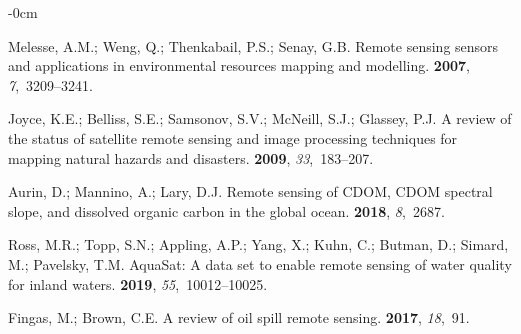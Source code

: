 \documentclass[remotesensing,article,accept,pdftex,moreauthors]{Definitions/mdpi}
\begin{document}
\begin{adjustwidth}{-\extralength}{0cm}




\begin{thebibliography}{999}

Melesse, A.M.; Weng, Q.; Thenkabail, P.S.; Senay, G.B.
\newblock Remote sensing sensors and applications in environmental resources
  mapping and modelling.
 {\bf 2007}, {\em 7},~3209--3241.

Joyce, K.E.; Belliss, S.E.; Samsonov, S.V.; McNeill, S.J.; Glassey, P.J.
\newblock A review of the status of satellite remote sensing and image
  processing techniques for mapping natural hazards and disasters.
 {\bf 2009}, {\em 33},~183--207.

Aurin, D.; Mannino, A.; Lary, D.J.
\newblock Remote sensing of CDOM, CDOM spectral slope, and dissolved organic
  carbon in the global ocean.
 {\bf 2018}, {\em 8},~2687.

Ross, M.R.; Topp, S.N.; Appling, A.P.; Yang, X.; Kuhn, C.; Butman, D.; Simard,
  M.; Pavelsky, T.M.
\newblock AquaSat: A data set to enable remote sensing of water quality for
  inland waters.
 {\bf 2019}, {\em 55},~10012--10025.

Fingas, M.; Brown, C.E.
\newblock A review of oil spill remote sensing.
 {\bf 2017}, {\em 18},~91.


\end{thebibliography}
\end{adjustwidth}
\end{document}

